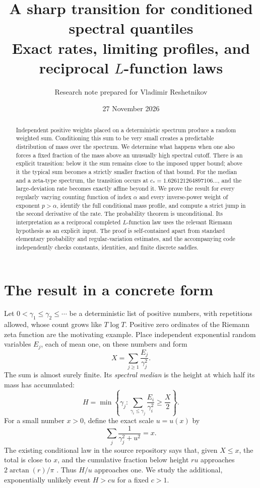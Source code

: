 \documentclass[11pt,letterpaper]{article}
\title{\vspace{-1em}\textbf{A sharp transition for conditioned spectral quantiles}\\[0.45em]
\large Exact rates, limiting profiles, and reciprocal $L$-function laws}
\author{Research note prepared for Vladimir Reshetnikov}
\date{27 November 2026}
\numberwithin{equation}{section}
\theoremstyle{definition}
\theoremstyle{remark}
\begin{document}
\maketitle
\begin{abstract}
Independent positive weights placed on a deterministic spectrum produce a random weighted sum. Conditioning this sum to be very small creates a predictable distribution of mass over the spectrum. We determine what happens when one also forces a fixed fraction of the mass above an unusually high spectral cutoff. There is an explicit transition: below it the sum remains close to the imposed upper bound; above it the typical sum becomes a strictly smaller fraction of that bound. For the median and a zeta-type spectrum, the transition occurs at $c_*=1.626121264897106\ldots$, and the large-deviation rate becomes exactly affine beyond it. We prove the result for every regularly varying counting function of index $\alpha$ and every inverse-power weight of exponent $p>\alpha$, identify the full conditional mass profile, and compute a strict jump in the second derivative of the rate. The probability theorem is unconditional. Its interpretation as a reciprocal completed $L$-function law uses the relevant Riemann hypothesis as an explicit input. The proof is self-contained apart from standard elementary probability and regular-variation estimates, and the accompanying code independently checks constants, identities, and finite discrete saddles.
\end{abstract}
\setcounter{tocdepth}{1}
\tableofcontents
\clearpage

\section{The result in a concrete form}\label{sec:concrete}

Let $0<\gamma_1\le\gamma_2\le\cdots$ be a deterministic list of positive numbers, with repetitions allowed, whose count grows like $T\log T$. Positive zero ordinates of the Riemann zeta function are the motivating example. Place independent exponential random variables $E_j$, each of mean one, on these numbers and form
\begin{equation}\label{eq:exampleX}
 X=\sum_{j\ge1}\frac{E_j}{\gamma_j^2}.
\end{equation}
The sum is almost surely finite. Its \emph{spectral median} is the height at which half its mass has accumulated:
\begin{equation}\label{eq:exampleH}
 H=\min\left\{\gamma_j:\sum_{\gamma_i\le\gamma_j}\frac{E_i}{\gamma_i^2}\ge\frac X2\right\}.
\end{equation}
For a small number $x>0$, define the exact scale $u=u(x)$ by
\begin{equation}\label{eq:examplesaddle}
 \sum_j\frac1{\gamma_j^2+u^2}=x.
\end{equation}
The existing conditional law in the source repository says that, given $X\le x$, the total is close to $x$, and the cumulative fraction below height $ru$ approaches $2\arctan(r)/\pi$ \cite{ProveIt}. Thus $H/u$ approaches one. We study the additional, exponentially unlikely event $H>cu$ for a fixed $c>1$.
\end{document}
